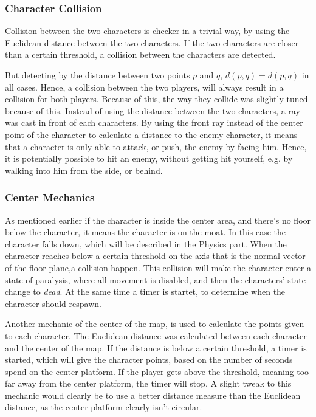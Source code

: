\documentclass[12pt,a4paper,titlepage]{article}
\begin{document}
\subsubsection*{Character Collision}
\label{sec-2-4-2}
Collision between the two characters is checker in a trivial way, by using the
Euclidean distance between the two characters. If the two characters are closer
than a certain threshold, a collision between the characters are detected.

But detecting by the distance between two points $p$ and $q$, $d(p,q) =
d(p,q)$ in all cases. Hence, a collision between the two players, will always
result in a collision for both players. Because of this, the way they collide
was slightly tuned because of this. Instead of using the distance between the
two characters, a ray was cast in front of each characters. By using the
front ray instead of the center point of the character to calculate a
distance to the enemy character, it means that a character is only able to
attack, or push, the enemy by facing him. Hence, it is potentially possible
to hit an enemy, without getting hit yourself, e.g. by walking into him from
the side, or behind.

\subsubsection*{Center Mechanics}
\label{sec-2-4-3}
As mentioned earlier if the character is inside the center area, and there's
no floor
below the character, it means the character is on the moat. In this case the
character falls down, which will be described in the Physics part. When the
character reaches below a certain threshold on the axis that is the normal
vector of the floor plane,a collision happen. This collision will make the
character enter a state of paralysis, where all movement is disabled, and then the
characters' state change to \emph{dead}. At the same time a timer is startet, to
determine when the character should respawn.

Another mechanic of the center of the map, is used to calculate the points
given to each character. The Euclidean distance was calculated between each
character and the center of the map. If the distance is below a certain
threshold, a timer is started, which will give the character points, based on
the number of seconds spend on the center platform. If the player gets above
the threshold, meaning too far away from the center platform, the timer will
stop. A slight tweak to this mechanic would clearly be to use a better
distance measure than the Euclidean distance, as the center platform clearly
isn't circular.
\end{document}
